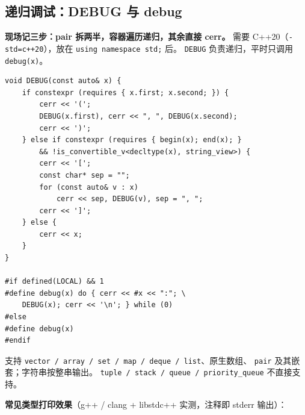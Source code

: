 	\subsection{递归调试：DEBUG 与 debug}

	\textbf{现场记三步：pair 拆两半，容器遍历递归，其余直接 cerr。}
	需要 C++20（\texttt{-std=c++20}），放在 \texttt{using namespace std;} 后。
	\texttt{DEBUG} 负责递归，平时只调用 \texttt{debug(x)}。

	\begin{verbatim}
void DEBUG(const auto& x) {
    if constexpr (requires { x.first; x.second; }) {
        cerr << '(';
        DEBUG(x.first), cerr << ", ", DEBUG(x.second);
        cerr << ')';
    } else if constexpr (requires { begin(x); end(x); }
        && !is_convertible_v<decltype(x), string_view>) {
        cerr << '[';
        const char* sep = "";
        for (const auto& v : x)
            cerr << sep, DEBUG(v), sep = ", ";
        cerr << ']';
    } else {
        cerr << x;
    }
}

#if defined(LOCAL) && 1
#define debug(x) do { cerr << #x << ":"; \
    DEBUG(x); cerr << '\n'; } while (0)
#else
#define debug(x)
#endif
	\end{verbatim}

	支持 \texttt{vector / array / set / map / deque / list}、原生数组、
	\texttt{pair} 及其嵌套；字符串按整串输出。
	\texttt{tuple / stack / queue / priority\_queue} 不直接支持。

	\textbf{常见类型打印效果}（g++ / clang + libstdc++ 实测，注释即 stderr 输出）：

